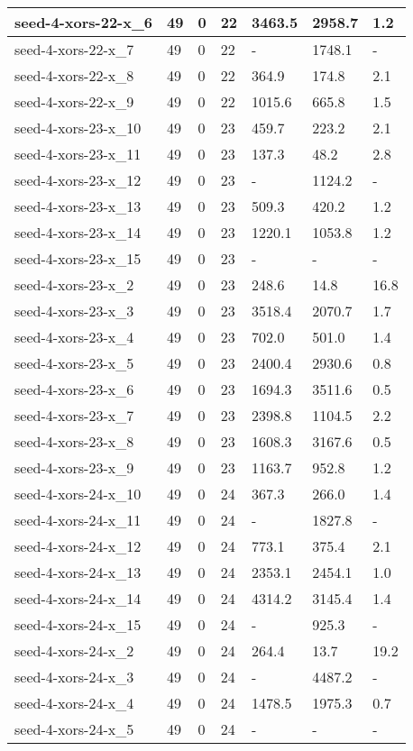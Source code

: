 \begin{scriptsize}
\begin{longtable}{|p{5cm}|l|l|l|l|l|l|}
seed-4-xors-22-x\_6&49&0&22&3463.5&2958.7&1.2 \\ \hline 
seed-4-xors-22-x\_7&49&0&22&-&1748.1&- \\ \hline 
seed-4-xors-22-x\_8&49&0&22&364.9&174.8&2.1 \\ \hline 
seed-4-xors-22-x\_9&49&0&22&1015.6&665.8&1.5 \\ \hline 
seed-4-xors-23-x\_10&49&0&23&459.7&223.2&2.1 \\ \hline 
seed-4-xors-23-x\_11&49&0&23&137.3&48.2&2.8 \\ \hline 
seed-4-xors-23-x\_12&49&0&23&-&1124.2&- \\ \hline 
seed-4-xors-23-x\_13&49&0&23&509.3&420.2&1.2 \\ \hline 
seed-4-xors-23-x\_14&49&0&23&1220.1&1053.8&1.2 \\ \hline 
seed-4-xors-23-x\_15&49&0&23&-&-&- \\ \hline 
seed-4-xors-23-x\_2&49&0&23&248.6&14.8&16.8 \\ \hline 
seed-4-xors-23-x\_3&49&0&23&3518.4&2070.7&1.7 \\ \hline 
seed-4-xors-23-x\_4&49&0&23&702.0&501.0&1.4 \\ \hline 
seed-4-xors-23-x\_5&49&0&23&2400.4&2930.6&0.8 \\ \hline 
seed-4-xors-23-x\_6&49&0&23&1694.3&3511.6&0.5 \\ \hline 
seed-4-xors-23-x\_7&49&0&23&2398.8&1104.5&2.2 \\ \hline 
seed-4-xors-23-x\_8&49&0&23&1608.3&3167.6&0.5 \\ \hline 
seed-4-xors-23-x\_9&49&0&23&1163.7&952.8&1.2 \\ \hline 
seed-4-xors-24-x\_10&49&0&24&367.3&266.0&1.4 \\ \hline 
seed-4-xors-24-x\_11&49&0&24&-&1827.8&- \\ \hline 
seed-4-xors-24-x\_12&49&0&24&773.1&375.4&2.1 \\ \hline 
seed-4-xors-24-x\_13&49&0&24&2353.1&2454.1&1.0 \\ \hline 
seed-4-xors-24-x\_14&49&0&24&4314.2&3145.4&1.4 \\ \hline 
seed-4-xors-24-x\_15&49&0&24&-&925.3&- \\ \hline 
seed-4-xors-24-x\_2&49&0&24&264.4&13.7&19.2 \\ \hline 
seed-4-xors-24-x\_3&49&0&24&-&4487.2&- \\ \hline 
seed-4-xors-24-x\_4&49&0&24&1478.5&1975.3&0.7 \\ \hline 
seed-4-xors-24-x\_5&49&0&24&-&-&- \\ \hline 

\end{longtable}
\end{scriptsize}
